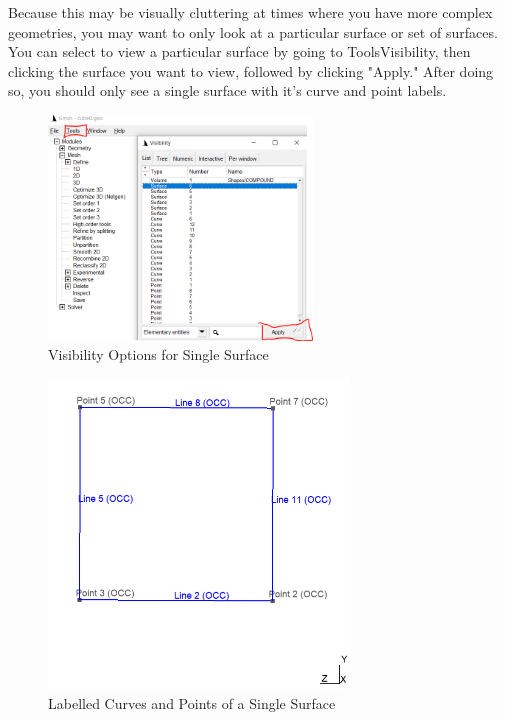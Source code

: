\documentclass{report}
\begin{document}
Because this may be visually cluttering at times where you have more complex geometries, you may want to only look at a particular surface or set of surfaces. You can select to view a particular surface by going to Tools\textrightarrow Visibility, then clicking the surface you want to view, followed by clicking "Apply." After doing so, you should only see a single surface with it's curve and point labels.
\begin{figure}[h]
  \centering
  \includegraphics[width=7cm]{cube_visibility_options_2.png}
  \setcaptionwidth{7cm}
  \caption{Visibility Options for Single Surface}
  \label{cube_tech_ill}
\end{figure}

\begin{figure}[h]
  \centering
  \includegraphics[width=8cm]{cube_1_surface.png}
  \setcaptionwidth{10cm}
  \caption{Labelled Curves and Points of a Single Surface}
  \label{Cube_P_C}
\end{figure}
 \newpage
\end{document}
